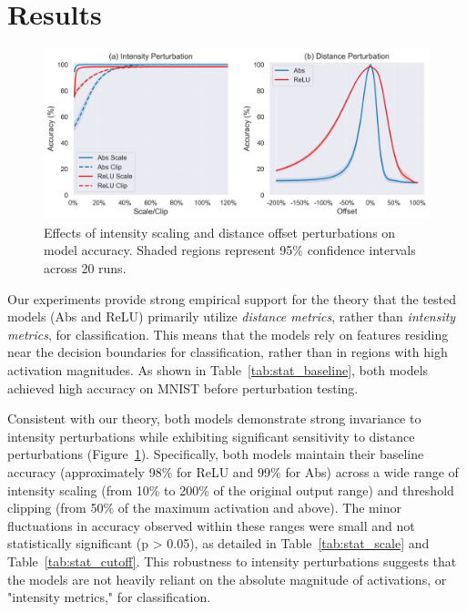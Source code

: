\section{Results}

\begin{figure}[h]
  \centering
  \includegraphics[width=\textwidth]{images/perturbation_analysis}
  \caption{Effects of intensity scaling and distance offset perturbations on model accuracy. Shaded regions represent 95\% confidence intervals across 20 runs.}
  \label{fig:perturbation_analysis}
\end{figure}

Our experiments provide strong empirical support for the theory that the tested models (Abs and ReLU) primarily utilize \textit{distance metrics}, rather than \textit{intensity metrics}, for classification. This means that the models rely on features residing near the decision boundaries for classification, rather than in regions with high activation magnitudes. As shown in Table~\ref{tab:stat_baseline}, both models achieved high accuracy on MNIST before perturbation testing. 

Consistent with our theory, both models demonstrate strong invariance to intensity perturbations while exhibiting significant sensitivity to distance perturbations (Figure~\ref{fig:perturbation_analysis}).  Specifically, both models maintain their baseline accuracy (approximately 98\% for ReLU and 99\% for Abs) across a wide range of intensity scaling (from 10\% to 200\% of the original output range) and threshold clipping (from 50\% of the maximum activation and above). The minor fluctuations in accuracy observed within these ranges were small and not statistically significant (p > 0.05), as detailed in Table~\ref{tab:stat_scale} and Table~\ref{tab:stat_cutoff}. This robustness to intensity perturbations suggests that the models are not heavily reliant on the absolute magnitude of activations, or "intensity metrics," for classification.

